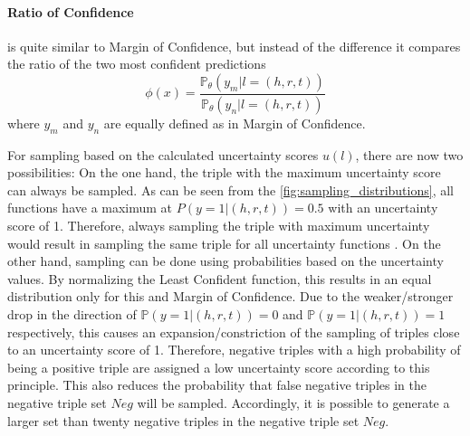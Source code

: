 \paragraph{\textbf{Ratio of Confidence}}
is quite similar to Margin of Confidence, but instead of the difference it compares the ratio of the two most confident predictions
\begin{equation}
    \phi(x) = \frac{\mathds{P}_{\theta}(y_m | l = (h,r,t))}{\mathds{P}_{\theta}(y_n | l = (h,r,t))} 
\end{equation}
where $y_m$ and $y_n$ are equally defined as in Margin of Confidence.

For sampling based on the calculated uncertainty scores $u(l)$, there are now two possibilities:
On the one hand, the triple with the maximum uncertainty score can always be sampled.
As can be seen from the \autoref{fig:sampling_distributions}, all functions have a maximum at $P(y = 1 | (h,r,t)) = 0.5$ with an uncertainty score of 1. 
Therefore, always sampling the triple with maximum uncertainty would result in sampling the same triple for all uncertainty functions \cite{nguyen2021howtomeasure, human-in-the-loop}.
On the other hand, sampling can be done using probabilities based on the uncertainty values.
By normalizing the Least Confident function, this results in an equal distribution only for this and Margin of Confidence.    
Due to the weaker/stronger drop in the direction of $\mathds{P}(y = 1 | (h,r,t)) = 0$ and $\mathds{P}(y = 1 | (h,r,t)) = 1$ respectively, this causes an expansion/constriction of the sampling of triples close to an uncertainty score of 1.
Therefore, negative triples with a high probability of being a positive triple are assigned a low uncertainty score according to this principle.
This also reduces the probability that false negative triples in the negative triple set $Neg$ will be sampled.
Accordingly, it is possible to generate a larger set than twenty negative triples in the negative triple set $Neg$.


